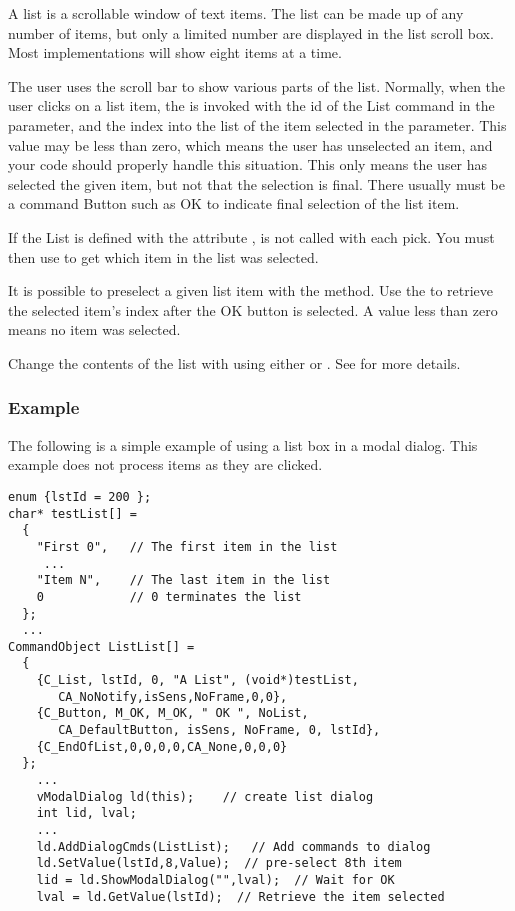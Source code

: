 A list is a scrollable window of text items. The list can be made
up of any number of items, but only a limited number are
displayed in the list scroll box.  Most implementations will show
eight items at a time.

The user uses the scroll bar to show various parts of the list.
Normally, when the user clicks on a list item, the 
is invoked with the id of the List command in the 
parameter, and the index into the list of the item selected in
the  parameter.  This value may be less than zero,
which means the user has unselected an item, and your code
should properly handle this situation. This only means the user
has selected the given item, but not that the selection is final.
There usually must be a command Button such as OK to indicate
final selection of the list item.

If the List is defined with the attribute ,
 is not called with each pick. You must then
use  to get which item in the list was selected.

It is possible to preselect a given list item with the
 method. Use the  to
retrieve the selected item's index after the OK button is selected.
A value less than zero means no item was selected.

Change the contents of the list with
 using either  or
. See  for more
details.

\subsubsection* {Example}

The following is a simple example of using a list box in a modal
dialog.  This example does not process items as they are clicked.

\footnotesize
\begin{verbatim}
enum {lstId = 200 };
char* testList[] =
  {
    "First 0",   // The first item in the list
     ...
    "Item N",    // The last item in the list
    0            // 0 terminates the list
  };
  ...
CommandObject ListList[] =
  {
    {C_List, lstId, 0, "A List", (void*)testList,
       CA_NoNotify,isSens,NoFrame,0,0},
    {C_Button, M_OK, M_OK, " OK ", NoList,
       CA_DefaultButton, isSens, NoFrame, 0, lstId},
    {C_EndOfList,0,0,0,0,CA_None,0,0,0}
  };
    ...
    vModalDialog ld(this);    // create list dialog
    int lid, lval;
    ...
    ld.AddDialogCmds(ListList);   // Add commands to dialog
    ld.SetValue(lstId,8,Value);  // pre-select 8th item
    lid = ld.ShowModalDialog("",lval);  // Wait for OK
    lval = ld.GetValue(lstId);  // Retrieve the item selected
\end{verbatim}
\normalfont\normalsize


